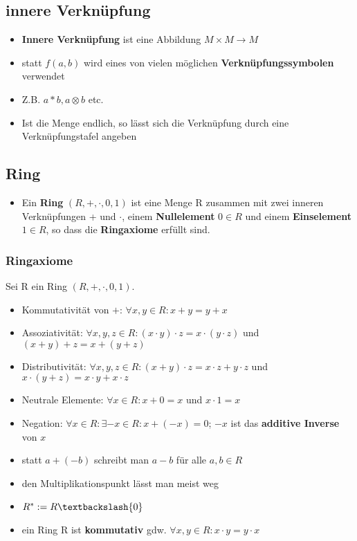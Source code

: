 \documentclass[titlepage]{article}
\newcommand{\1}{\mathbb{1}}
\newcommand{\0}{\mathbb{0}}
\begin{document}
			\subsection{innere Verknüpfung}
				\begin{itemize}
					\item \textbf{Innere Verknüpfung} ist eine Abbildung $M\times M\rightarrow M$
					\item statt $f(a,b)$ wird eines von vielen möglichen \textbf{Verknüpfungssymbolen} verwendet
					\item Z.B. $a*b,a\otimes b$ etc.
					\item Ist die Menge endlich, so lässt sich die Verknüpfung durch eine Verknüpfungstafel angeben 
				\end{itemize}
			\subsection{Ring}
				\begin{itemize}
					\item Ein \textbf{Ring} $(R,+,\cdot,0,1)$ ist eine Menge R zusammen mit zwei inneren Verknüpfungen + und $\cdot$, einem \textbf{Nullelement} $0\in R$ und einem \textbf{Einselement} $1\in R$, so dass die \textbf{Ringaxiome} erfüllt sind.
				\end{itemize}
				\subsubsection{Ringaxiome}
				Sei R ein Ring $(R,+,\cdot,0,1)$.
					\begin{itemize}
						\item Kommutativität von $+$: $\forall x,y\in R:x+y=y+x$
						\item Assoziativität: $\forall x,y,z\in R:(x\cdot y)\cdot z=x\cdot(y\cdot z)$ und $(x+y)+z=x+(y+z)$
						\item Distributivität: $\forall x,y,z\in R:(x+y)\cdot z=x\cdot z+y\cdot z$ und $x\cdot(y+z)=x\cdot y+x\cdot z$
						\item Neutrale Elemente: $\forall x\in R:x+0=x$ und $x\cdot 1=x$
						\item Negation: $\forall x\in R:\exists-x\in R:x+(-x)=0$; $-x$ ist das \textbf{additive Inverse} von $x$\\
						\item statt $a+(-b)$ schreibt man $a-b$ für alle $a,b\in R$
						\item den Multiplikationspunkt lässt man meist weg
						\item $R^*:=R\textbackslash\{0\}$
						\item ein Ring R ist \textbf{kommutativ} gdw. $\forall x,y\in R:x\cdot y=y\cdot x$
					\end{itemize}
\end{document}
